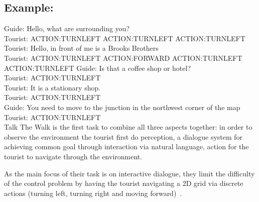 \subsection*{Example:}
Guide: Hello, what are surrounding you?\\ 
Tourist: ACTION:TURNLEFT ACTION:TURNLEFT ACTION:TURNLEFT\\ 
Tourist: Hello, in front of me is a Brooks Brothers \\
Tourist: ACTION:TURNLEFT ACTION:FORWARD ACTION:TURNLEFT ACTION:TURNLEFT 
Guide: Is that a coffee shop or hotel? \\
Tourist: ACTION:TURNLEFT \\
Tourist: It is a stationary shop.\\ 
Tourist: ACTION:TURNLEFT \\
Guide: You need to move to the junction in the northwest corner of the map\\
Tourist: ACTION:TURNLEFT \\ 

Talk The Walk is the first task to combine all three aspects together: in order to observe the environment the tourist first do perception, a dialogue system for achieving common goal through interaction via natural language, action for the tourist to navigate through the environment.

As the main focus of their task is on interactive dialogue, they limit the difficulty of the control problem by having the tourist navigating a 2D grid via discrete actions (turning left, turning right and moving forward)~\cite{DBLP:journals/corr/abs-1807-03367}.
 
 